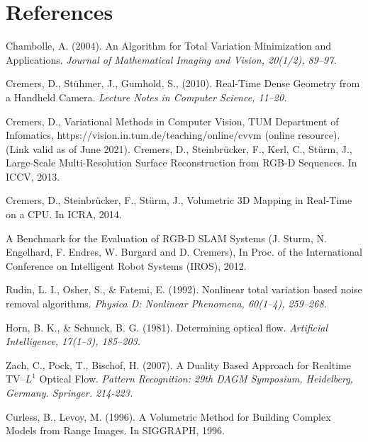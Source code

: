 \documentclass[conference]{IEEEtran}
\begin{document}
\section*{References}
\begin{thebibliography}{00}



    Chambolle, A. (2004). An Algorithm for Total Variation Minimization and Applications.
    \textit{Journal of Mathematical Imaging and Vision, 20(1/2), 89--97.}

Cremers, D., St\"uhmer, J., Gumhold, S., (2010). Real-Time Dense Geometry from a Handheld Camera.
    \textit{Lecture Notes in Computer Science, 11--20.}

    Cremers, D., Variational Methods in Computer Vision, TUM Department of Infomatics, https://vision.in.tum.de/teaching/online/cvvm (online resource). (Link valid as of June 2021).
    Cremers, D., Steinbr\"ucker, F., Kerl, C., St\"urm, J., Large-Scale Multi-Resolution Surface Reconstruction from RGB-D Sequences. In ICCV, 2013.

    Cremers, D., Steinbr\"ucker, F., St\"urm, J., Volumetric 3D Mapping in Real-Time on a CPU. In ICRA, 2014.

    A Benchmark for the Evaluation of RGB-D SLAM Systems (J. Sturm, N. Engelhard, F. Endres, W. Burgard and D. Cremers), In Proc. of the International Conference on Intelligent Robot Systems (IROS), 2012. 

    Rudin, L. I., Osher, S., \& Fatemi, E. (1992). Nonlinear total variation based noise removal algorithms.
    \textit{Physica D: Nonlinear Phenomena, 60(1--4), 259--268.}

    Horn, B. K., \& Schunck, B. G. (1981). Determining optical flow.
    \textit{Artificial Intelligence, 17(1--3), 185--203.}


Zach, C., Pock, T., Bischof, H. (2007). A Duality Based Approach for Realtime TV--$L^1$ Optical Flow. 
    \textit{Pattern Recognition: 29th DAGM Symposium, Heidelberg, Germany. Springer. 214-223.}

    Curless, B., Levoy, M. (1996). A Volumetric Method for Building Complex Models from Range Images. In SIGGRAPH, 1996.


\end{thebibliography}
\end{document}
